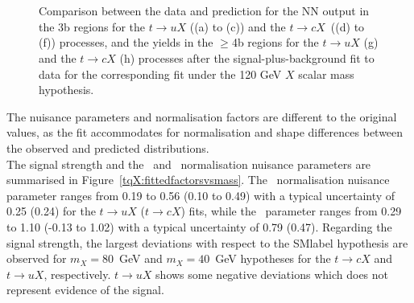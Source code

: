 \begin{figure}[htb]
    \RawFloats
    \centering
     \\
     \\ 
    \caption{Comparison between the data and prediction for the NN output in the 3b regions for the $t\to uX$ ((a) to (c))
    and the $t\to cX$\ ((d) to (f)) processes, 
    and the yields in the $\geq$4b regions for the $t\to uX$ (g) and the $t\to cX$ (h) processes 
    after the signal-plus-background fit to data for the corresponding fit under the 120 GeV $X$ scalar mass hypothesis.}
    \label{tqX:NNfit120}
\end{figure}


\clearpage

The nuisance parameters and normalisation factors are different to the original values, as the fit accommodates for normalisation and shape differences between the observed and predicted distributions.\\

The signal strength and the \ttb\ and \ttc\ normalisation nuisance parameters are summarised in Figure~\ref{tqX:fittedfactorsvsmass}. The \ttb\ normalisation nuisance parameter ranges from 0.19 to 0.56 (0.10 to 0.49) with a typical uncertainty of 0.25 (0.24) for the $t\to uX$ ($t\to cX$) fits, while the \ttc\ parameter ranges from 0.29 to 1.10 (-0.13 to 1.02) with a typical uncertainty of 0.79 (0.47). Regarding the signal strength, the largest deviations with respect to the \acrshort{SMlabel} hypothesis are observed for $m_X=80$~GeV  and $m_X=40$~GeV hypotheses for the $t\to cX$ and $t\to uX$, respectively. $t\to uX$ shows some negative deviations which does not represent evidence of the signal.\\

